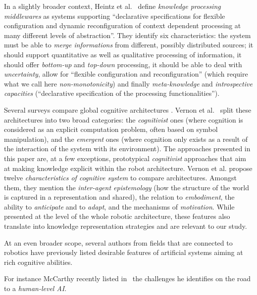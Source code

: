 In a slightly broader context, Heintz et al.~\cite{Heintz2008} define
\emph{knowledge processing middlewares} as systems supporting ``declarative
specifications for flexible configuration and dynamic reconfiguration of
context dependent processing at many different levels of abstraction''. They
identify six characteristics: the system must be able to \emph{merge informations}
from different, possibly distributed sources; it should support quantitative as
well as qualitative processing of information, it should offer \emph{bottom-up} and
\emph{top-down} processing, it should be able to deal with \emph{uncertainty}, allow for
``flexible configuration and reconfiguration'' (which require what we call here
\emph{non-monotonicity}) and finally \emph{meta-knowledge} and
\emph{introspective capacities} (``declarative specification of the processing
functionalities'').

Several surveys compare global cognitive architectures \cite{Vernon2007, Chong2009}.
Vernon et al.~\cite{Vernon2007} split these architectures into two broad
categories: the \emph{cognitivist} ones (where cognition is considered as an
explicit computation problem, often based on symbol manipulation), and the
\emph{emergent} ones (where cognition only exists as a result of the
interaction of the system with its environment). The approaches presented in
this paper are, at a few exceptions, prototypical \emph{cognitivist} approaches
that aim at making knowledge explicit within the robot architecture. Vernon et
al. propose twelve \emph{characteristics of cognitive system} to compare
architectures. Amongst them, they mention the \emph{inter-agent epistemology} (how
the structure of the world is captured in a representation and shared), the
relation to \emph{embodiment}, the ability to \emph{anticipate} and to
\emph{adapt}, and the mechanisms of \emph{motivation}. While presented at the
level of the whole robotic architecture, these features also translate into
knowledge representation strategies and are relevant to our study.

At an even broader scope, several authors from fields that are connected to robotics
have previously listed desirable features of artificial systems aiming at
rich cognitive abilities.

For instance McCarthy recently listed in~\cite{McCarthy2007} the challenges
he identifies on the road to a \emph{human-level AI}.

